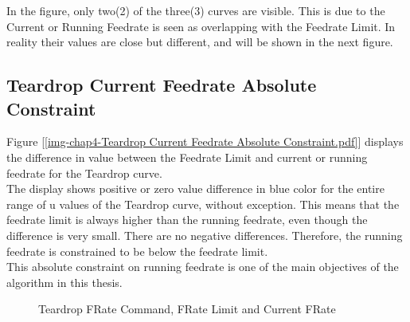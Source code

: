In the figure, only two(2) of the three(3) curves are visible. This is due to the Current or Running Feedrate is seen as overlapping with the Feedrate Limit. In reality their values are close but different, and will be shown in the next figure.


\subsection{Teardrop Current Feedrate Absolute Constraint}
\label{ssec-chap4-Teardrop Current Feedrate Absolute Constraint}

Figure [\ref{img-chap4-Teardrop Current Feedrate Absolute Constraint.pdf}] displays the difference in value between the Feedrate Limit and current or running feedrate for the Teardrop curve.\\

The display shows positive or zero value difference in blue color for the entire range of u values of the Teardrop curve, without exception. This means that the feedrate limit is always higher than the running feedrate, even though the difference is very small. There are no negative differences. Therefore, the running feedrate is constrained to be below the feedrate limit.\\  

This absolute constraint on running feedrate is one of the main objectives of the algorithm in this thesis.

\clearpage
\pagebreak

\begin{figure}
	\caption  {Teardrop FRate Command, FRate Limit and Current FRate}
	\label{img-chap4-Teardrop-FeedrateCommand-FeedrateLimit-CurrentFeedrate.pdf}
\end{figure}	

